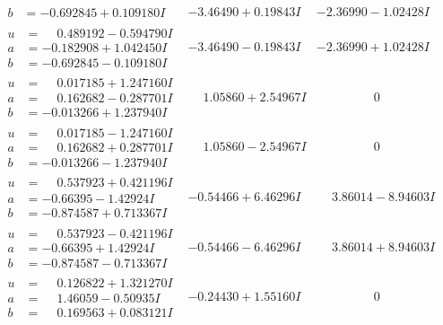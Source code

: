 \documentclass[1p]{elsarticle_modified}
\theoremstyle{definition}
\begin{document}
$$\begin{array}{c|c|c}
\begin{aligned}
b &= -0.692845 + 0.109180 I\end{aligned}
 & -3.46490 + 0.19843 I & -2.36990 - 1.02428 I \\ \hline\begin{aligned}
u &= \phantom{-}0.489192 - 0.594790 I \\
a &= -0.182908 + 1.042450 I \\
b &= -0.692845 - 0.109180 I\end{aligned}
 & -3.46490 - 0.19843 I & -2.36990 + 1.02428 I \\ \hline\begin{aligned}
u &= \phantom{-}0.017185 + 1.247160 I \\
a &= \phantom{-}0.162682 - 0.287701 I \\
b &= -0.013266 + 1.237940 I\end{aligned}
 & \phantom{-}1.05860 + 2.54967 I & \phantom{-0.000000 } 0 \\ \hline\begin{aligned}
u &= \phantom{-}0.017185 - 1.247160 I \\
a &= \phantom{-}0.162682 + 0.287701 I \\
b &= -0.013266 - 1.237940 I\end{aligned}
 & \phantom{-}1.05860 - 2.54967 I & \phantom{-0.000000 } 0 \\ \hline\begin{aligned}
u &= \phantom{-}0.537923 + 0.421196 I \\
a &= -0.66395 - 1.42924 I \\
b &= -0.874587 + 0.713367 I\end{aligned}
 & -0.54466 + 6.46296 I & \phantom{-}3.86014 - 8.94603 I \\ \hline\begin{aligned}
u &= \phantom{-}0.537923 - 0.421196 I \\
a &= -0.66395 + 1.42924 I \\
b &= -0.874587 - 0.713367 I\end{aligned}
 & -0.54466 - 6.46296 I & \phantom{-}3.86014 + 8.94603 I \\ \hline\begin{aligned}
u &= \phantom{-}0.126822 + 1.321270 I \\
a &= \phantom{-}1.46059 - 0.50935 I \\
b &= \phantom{-}0.169563 + 0.083121 I\end{aligned}
 & -0.24430 + 1.55160 I & \phantom{-0.000000 } 0 \\ \hline\begin{aligned}

\end{aligned}
\end{array}$$
\end{document}
